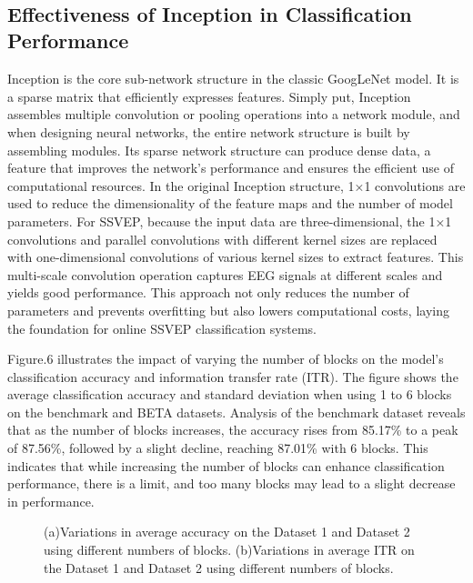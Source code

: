 \documentclass[10pt]{iopart}
\begin{document}
‌\subsection{Effectiveness of Inception in Classification Performance}
Inception is the core sub-network structure in the classic GoogLeNet model. It is a sparse matrix that efficiently expresses features\cite{szegedy2015going}. Simply put, Inception assembles multiple convolution or pooling operations into a network module, and when designing neural networks, the entire network structure is built by assembling modules. Its sparse network structure can produce dense data, a feature that improves the network’s performance and ensures the efficient use of computational resources. In the original Inception structure, 1×1 convolutions are used to reduce the dimensionality of the feature maps and the number of model parameters. For SSVEP, because the input data are three-dimensional, the 1×1 convolutions and parallel convolutions with different kernel sizes are replaced with one-dimensional convolutions of various kernel sizes to extract features. This multi-scale convolution operation captures EEG signals at different scales and yields good performance. This approach not only reduces the number of parameters and prevents overfitting but also lowers computational costs, laying the foundation for online SSVEP classification systems.

Figure.6 illustrates the impact of varying the number of blocks on the model's classification accuracy and information transfer rate (ITR). The figure shows the average classification accuracy and standard deviation when using 1 to 6 blocks on the benchmark and BETA datasets. Analysis of the benchmark dataset reveals that as the number of blocks increases, the accuracy rises from 85.17\% to a peak of 87.56\%, followed by a slight decline, reaching 87.01\% with 6 blocks. This indicates that while increasing the number of blocks can enhance classification performance, there is a limit, and too many blocks may lead to a slight decrease in performance.

\begin{figure*}[t]
    \centering
    \caption{(a)Variations in average accuracy on the Dataset 1 and Dataset 2 using different numbers of blocks.
    (b)Variations in average ITR on the Dataset 1 and Dataset 2 using different numbers of blocks.}
\end{figure*}
\end{document}
